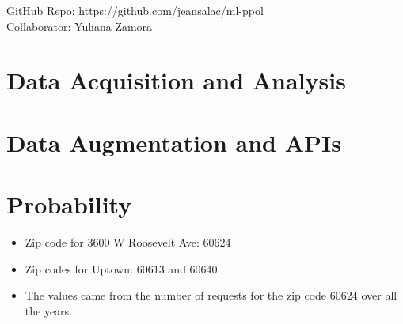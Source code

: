 \documentclass[letterpaper,12pt]{article}
\begin{document}
\maketitle
\begin{center}
GitHub Repo: https://github.com/jeansalac/ml-ppol \\
Collaborator: Yuliana Zamora
\end{center}

\section{Data Acquisition and Analysis}

\section{Data Augmentation and APIs}

\section{Probability}
\begin{itemize}
\item Zip code for 3600 W Roosevelt Ave: 60624
\item Zip codes for Uptown: 60613 and 60640
\item The values came from the number of requests for the zip code 60624 over all the years.
\end{itemize}
\end{document}
